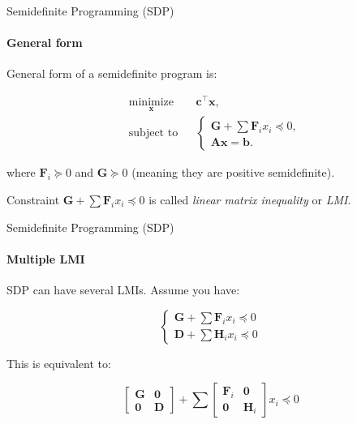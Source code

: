 \documentclass{beamer}
\begin{document}
\begin{frame}{Semidefinite Programming (SDP)}
\framesubtitle{General form}
\begin{flushleft}

General form of a semidefinite program is:

%
\begin{equation}
\begin{aligned}
& \underset{\mathbf{x}}{\text{minimize}}
& & \mathbf{c}^\top\mathbf{x}, \\
& \text{subject to}
& & \begin{cases}
    \mathbf{G} + \sum \mathbf{F}_i x_i \preceq 0, \\
    \mathbf{A}\mathbf{x} = \mathbf{b}.
    \end{cases}
\end{aligned}
\end{equation}

where $\mathbf{F}_i \succeq 0$ and $\mathbf{G} \succeq 0$ (meaning they are positive semidefinite).

\bigskip

Constraint $\mathbf{G} + \sum \mathbf{F}_i x_i \preceq 0$ is called \emph{linear matrix inequality} or \emph{LMI}.
 
\end{flushleft}
\end{frame}




\begin{frame}{Semidefinite Programming (SDP)}
\framesubtitle{Multiple LMI}
\begin{flushleft}

SDP can have several LMIs. Assume you have:

\begin{equation}
    \begin{cases}
        \mathbf{G} + \sum \mathbf{F}_i x_i \preceq 0 \\
        \mathbf{D} + \sum \mathbf{H}_i x_i \preceq 0
    \end{cases}
\end{equation}


This is equivalent to:

\begin{equation}
    \begin{bmatrix} 
            \mathbf{G} & \mathbf{0} \\
            \mathbf{0} & \mathbf{D}
    \end{bmatrix} +
    \sum
    \begin{bmatrix} 
            \mathbf{F}_i & \mathbf{0} \\
            \mathbf{0}   & \mathbf{H}_i
    \end{bmatrix}
    x_i \preceq 0
\end{equation}

\end{flushleft}
\end{frame}
\end{document}
